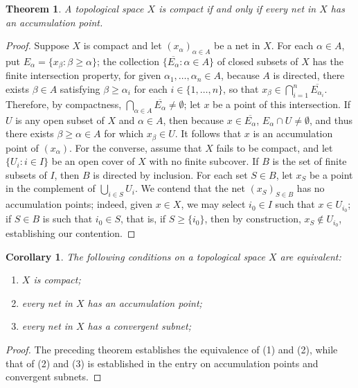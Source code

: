 \documentclass[12pt]{article}
\theoremstyle{plain}
\newtheorem*{thm*}{Theorem}
\newtheorem*{cor*}{Corollary}
\newcommand{\set}[1]{\{#1\}}
\begin{document}
\begin{thm*}
A topological space $X$ is compact if and only if every net in $X$ has an accumulation point.
\end{thm*}
\begin{proof}
Suppose $X$ is compact and let $(x_\alpha)_{\alpha\in A}$ be a net in $X$. For each $\alpha\in A$, put $E_\alpha=\set{x_\beta:\beta\geq\alpha}$; the collection $\set{\overline{E_\alpha}:\alpha\in A}$ of closed subsets of $X$ has the finite intersection property, for given $\alpha_1,\ldots,\alpha_n\in A$, because $A$ is directed, there exists $\beta\in A$ satisfying $\beta\geq\alpha_i$ for each $i\in\set{1,\ldots,n}$, so that $x_\beta\in\bigcap_{i=1}^n\overline{E_{\alpha_i}}$. Therefore, by compactness, $\bigcap_{\alpha\in A}\overline{E_\alpha}\neq\emptyset$; let $x$ be a point of this intersection. If $U$ is any open subset of $X$ and $\alpha\in A$, then because $x\in\overline{E_\alpha}$, $E_\alpha\cap U\neq\emptyset$, and thus there exists $\beta\geq\alpha\in A$ for which $x_\beta\in U$. It follows that $x$ is an accumulation point of $(x_\alpha)$. For the converse, assume that $X$ fails to be compact, and let $\set{U_i:i\in I}$ be an open cover of $X$ with no finite subcover. If $B$ is the set of finite subsets of $I$, then $B$ is directed by inclusion. For each set $S\in B$, let $x_S$ be a point in the complement of $\bigcup_{i\in S}U_i$. We contend that the net $(x_S)_{S\in B}$ has no accumulation points; indeed, given $x\in X$, we may select $i_0\in I$ such that $x\in U_{i_0}$; if $S\in B$ is such that $i_0\in S$, that is, if $S\geq\set{i_0}$, then by construction, $x_S\notin U_{i_0}$, establishing our contention. 
\end{proof}
\begin{cor*}
The following conditions on a topological space $X$ are equivalent:
\begin{enumerate}
\item $X$ is compact;
\item every net in $X$ has an accumulation point;
\item every net in $X$ has a convergent subnet;
\end{enumerate}
\end{cor*}
\begin{proof}
The preceding theorem establishes the equivalence of (1) and (2), while that of (2) and (3) is established in the entry on accumulation points and convergent subnets.
\end{proof}
\end{document}
